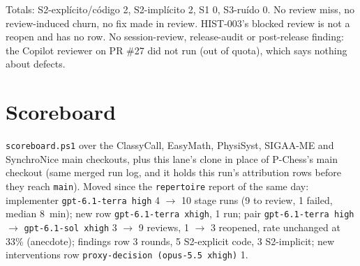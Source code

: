 \documentclass[11pt,a4paper]{article}
\begin{document}
Totals: S2-explícito/código 2, S2-implícito 2, S1 0, S3-ruído 0. No review miss, no
review-induced churn, no fix made in review. HIST-003's blocked review is not a reopen and has no
row. No session-review, release-audit or post-release finding: the Copilot reviewer on PR \#27
did not run (out of quota), which says nothing about defects.

\section*{Scoreboard}

\texttt{scoreboard.ps1} over the ClassyCall, EasyMath, PhysiSyst, SIGAA-ME and SynchroNice main
checkouts, plus this lane's clone in place of P-Chess's main checkout (same merged run log, and
it holds this run's attribution rows before they reach \texttt{main}). Moved since the
\texttt{repertoire} report of the same day: implementer \texttt{gpt-6.1-terra high} 4 $\to$ 10
stage runs (9 to review, 1 failed, median 8~min); new row \texttt{gpt-6.1-terra xhigh}, 1 run;
pair \texttt{gpt-6.1-terra high} $\rightarrow$ \texttt{gpt-6.1-sol xhigh} 3 $\to$ 9 reviews,
1 $\to$ 3 reopened, rate unchanged at 33\% (anecdote); findings row 3 rounds, 5 S2-explicit
code, 3 S2-implicit; new interventions row \texttt{proxy-decision (opus-5.5 xhigh)} 1.
\end{document}
